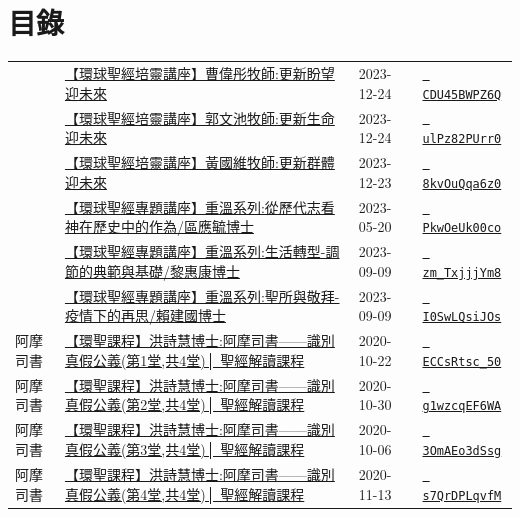 \documentclass{book}
\begin{document}
\section{目錄}
\label{sec:index}
{ \scriptsize


\begin{xltabular}{\textwidth}{|p{0.15\textwidth} p{0.6\textwidth}|p{0.07\textwidth} p{0.1\textwidth}|}
\hline
    & \hyperref[sec:CDU45BWPZ6Q]{【環球聖經培靈講座】曹偉彤牧師:更新盼望迎未來} & 2023-12-24 & \href{https://youtube.com/watch?v=CDU45BWPZ6Q}{\texttt{ CDU45BWPZ6Q}} \\
    & \hyperref[sec:ulPz82PUrr0]{【環球聖經培靈講座】郭文池牧師:更新生命迎未來} & 2023-12-24 & \href{https://youtube.com/watch?v=ulPz82PUrr0}{\texttt{ ulPz82PUrr0}} \\
    & \hyperref[sec:8kvOuQqa6z0]{【環球聖經培靈講座】黃國維牧師:更新群體迎未來} & 2023-12-23 & \href{https://youtube.com/watch?v=8kvOuQqa6z0}{\texttt{ 8kvOuQqa6z0}} \\
    & \hyperref[sec:PkwOeUk00co]{【環球聖經專題講座】重溫系列:從歷代志看神在歷史中的作為/區應毓博士} & 2023-05-20 & \href{https://youtube.com/watch?v=PkwOeUk00co}{\texttt{ PkwOeUk00co}} \\
    & \hyperref[sec:zm_TxjjjYm8]{【環球聖經專題講座】重溫系列:生活轉型-調節的典範與基礎/黎惠康博士} & 2023-09-09 & \href{https://youtube.com/watch?v=zm_TxjjjYm8}{\texttt{ zm\_TxjjjYm8}} \\
    & \hyperref[sec:I0SwLQsiJOs]{【環球聖經專題講座】重溫系列:聖所與敬拜-疫情下的再思/賴建國博士} & 2023-09-09 & \href{https://youtube.com/watch?v=I0SwLQsiJOs}{\texttt{ I0SwLQsiJOs}} \\
阿摩司書   & \hyperref[sec:ECCsRtsc_50]{【環聖課程】洪詩慧博士:阿摩司書——識別真假公義(第1堂,共4堂)│ 聖經解讀課程} & 2020-10-22 & \href{https://youtube.com/watch?v=ECCsRtsc_50}{\texttt{ ECCsRtsc\_50}} \\
阿摩司書   & \hyperref[sec:g1wzcqEF6WA]{【環聖課程】洪詩慧博士:阿摩司書——識別真假公義(第2堂,共4堂)│ 聖經解讀課程} & 2020-10-30 & \href{https://youtube.com/watch?v=g1wzcqEF6WA}{\texttt{ g1wzcqEF6WA}} \\
阿摩司書   & \hyperref[sec:3OmAEo3dSsg]{【環聖課程】洪詩慧博士:阿摩司書——識別真假公義(第3堂,共4堂)│ 聖經解讀課程} & 2020-10-06 & \href{https://youtube.com/watch?v=3OmAEo3dSsg}{\texttt{ 3OmAEo3dSsg}} \\
阿摩司書   & \hyperref[sec:s7QrDPLqvfM]{【環聖課程】洪詩慧博士:阿摩司書——識別真假公義(第4堂,共4堂)│ 聖經解讀課程} & 2020-11-13 & \href{https://youtube.com/watch?v=s7QrDPLqvfM}{\texttt{ s7QrDPLqvfM}} \\

\end{xltabular}}
\end{document}
